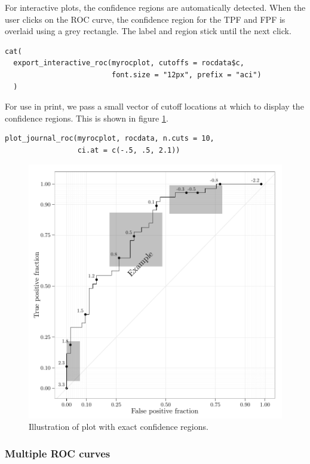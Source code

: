 \documentclass[article]{jss}
\begin{document}
For interactive plots, the confidence regions are automatically
detected. When the user clicks on the ROC curve, the confidence region
for the TPF and FPF is overlaid using a grey rectangle. The label and
region stick until the next click.

\begin{verbatim}
cat(
  export_interactive_roc(myrocplot, cutoffs = rocdata$c, 
                         font.size = "12px", prefix = "aci")
  )
\end{verbatim}

For use in print, we pass a small vector of cutoff locations at which to
display the confidence regions. This is shown in figure \ref{conf}.

\begin{verbatim}
plot_journal_roc(myrocplot, rocdata, n.cuts = 10, 
                 ci.at = c(-.5, .5, 2.1))
\end{verbatim}

\begin{figure}[htbp]
\centering
\includegraphics{figure/printci-1.pdf}
\caption{Illustration of  plot with exact confidence
regions. \label{conf}}
\end{figure}

\subsubsection{Multiple ROC curves}\label{multiple-roc-curves}
\end{document}
